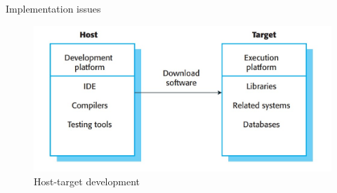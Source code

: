 \documentclass{beamer}
\begin{document}
\begin{frame}{Implementation issues}
	\begin{figure}
		\includegraphics[scale=.45]{img/m3_15}
		\caption{Host-target 
			development}
	\end{figure}
	
\end{frame}
\end{document}
